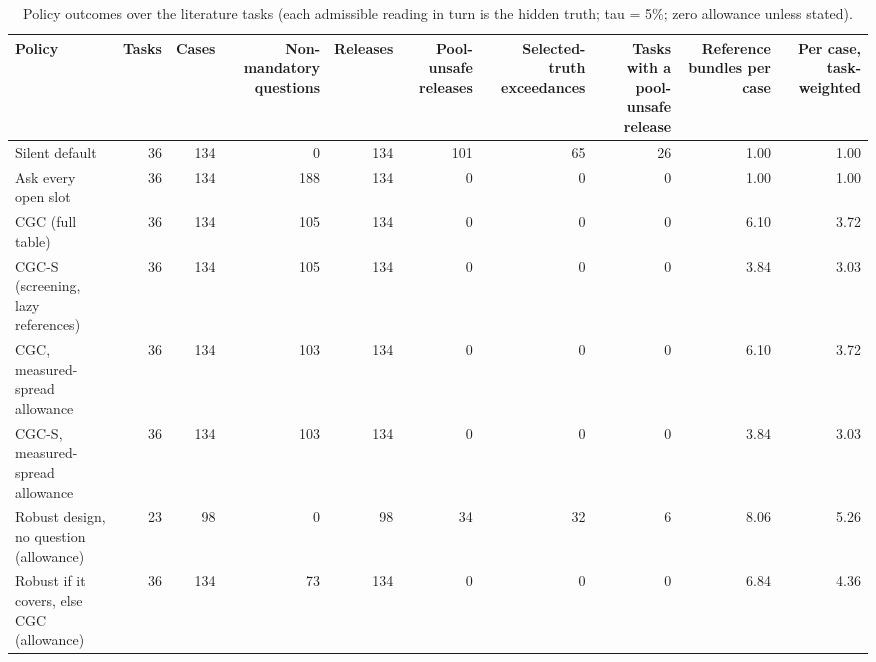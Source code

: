\begin{table}[t]
\centering\small
\caption{Policy outcomes over the literature tasks (each admissible reading in turn is the hidden truth; tau = 5\%; zero allowance unless stated).}
\label{tab:tab_policies}
\begin{tabular}{lrrrrrrrrr}
\toprule
Policy & Tasks & Cases & Non-mandatory questions & Releases & Pool-unsafe releases & Selected-truth exceedances & Tasks with a pool-unsafe release & Reference bundles per case & Per case, task-weighted \\
\midrule
Silent default & 36 & 134 & 0 & 134 & 101 & 65 & 26 & 1.00 & 1.00 \\
Ask every open slot & 36 & 134 & 188 & 134 & 0 & 0 & 0 & 1.00 & 1.00 \\
CGC (full table) & 36 & 134 & 105 & 134 & 0 & 0 & 0 & 6.10 & 3.72 \\
CGC-S (screening, lazy references) & 36 & 134 & 105 & 134 & 0 & 0 & 0 & 3.84 & 3.03 \\
CGC, measured-spread allowance & 36 & 134 & 103 & 134 & 0 & 0 & 0 & 6.10 & 3.72 \\
CGC-S, measured-spread allowance & 36 & 134 & 103 & 134 & 0 & 0 & 0 & 3.84 & 3.03 \\
Robust design, no question (allowance) & 23 & 98 & 0 & 98 & 34 & 32 & 6 & 8.06 & 5.26 \\
Robust if it covers, else CGC (allowance) & 36 & 134 & 73 & 134 & 0 & 0 & 0 & 6.84 & 4.36 \\
\bottomrule
\end{tabular}
\end{table}
